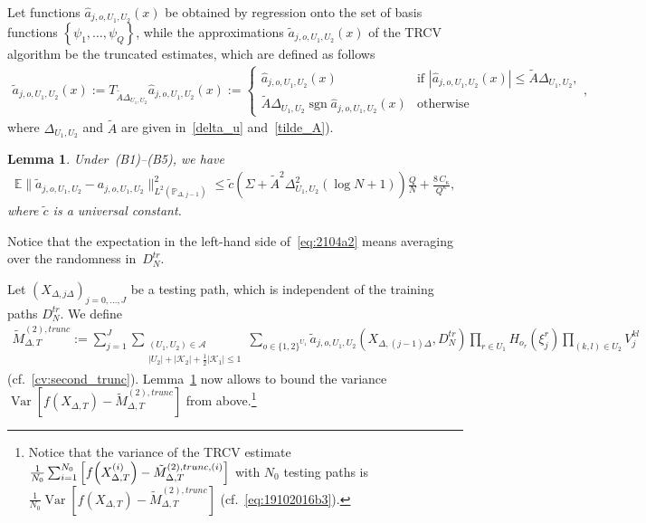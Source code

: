 \documentclass[11pt,a4paper]{amsart}
\theoremstyle{plain}
\newtheorem{lemma}[theorem]{Lemma}
\theoremstyle{definition}
\theoremstyle{remark}
\numberwithin{equation}{section}
\newcommand*{\E}{\mathbb{E}}
\newcommand*{\Var}{\operatorname{Var}}
\newcommand*{\PP}{\mathbb P}
\newcommand*{\cA}{\mathcal A}
\DeclareMathOperator{\sgn}{sgn}
\renewcommand*{\doteq}{:=}
\begin{document}
Let functions $\hat a_{j,o,U_1,U_2}(x)$
be obtained by regression onto the set of basis functions
$\left\{\psi_{1},\ldots,\psi_{Q}\right\}$,
while the approximations
$\tilde a_{j,o,U_1,U_2}(x)$ of the TRCV algorithm
be the truncated estimates, which are defined as follows
\begin{align}
\label{trunc_A}
\tilde a_{j,o,U_1,U_2}(x)\doteq
T_{\tilde A\Delta_{U_1,U_2}}\hat a_{j,o,U_1,U_2}(x)\doteq
\begin{cases}
\hat a_{j,o,U_1,U_2}(x)&\text{if }|\hat a_{j,o,U_1,U_2}(x)|\le\tilde A\Delta_{U_1,U_2},\\
\tilde A\Delta_{U_1,U_2}\sgn\hat a_{j,o,U_1,U_2}(x)&\text{otherwise}
\end{cases},
\end{align}
where $\Delta_{U_1,U_2}$ and $\tilde A$ are given in~\eqref{delta_u} and~\eqref{tilde_A}).

\begin{lemma}\label{th:2104a1}
Under~(B1)--(B5), we have
\begin{align}\label{eq:2104a2}
\E\|\tilde a_{j,o,U_1,U_2}-a_{j,o,U_1,U_2}\|^2_{L^2(\PP_{\Delta,j-1})}
\le\tilde{c}(\Sigma+\tilde A^2\Delta_{U_1,U_2}^2(\log N+1))\frac{Q}{N}
+\frac{8\,C_\kappa}{Q^\kappa},
\end{align}
where $\tilde{c}$ is a universal constant.
\end{lemma}
Notice that the expectation in the left-hand side of~\eqref{eq:2104a2}
means averaging over the randomness in~$D_N^{tr}$.

Let $(X_{\Delta,j\Delta})_{j=0,\ldots,J}$
be a testing path, which is independent of the
training paths $D_N^{tr}$.
We define
\begin{align}\label{eq:0101a1}
\widetilde{M}^{(2),trunc}_{\Delta,T}\doteq\sum_{j=1}^J
\sum_{\substack{(U_1,U_2)\in\cA\\ \left|U_2\right|+\left|\mathcal{K}_2\right|+\frac{1}{2}\left|\mathcal{K}_1\right|\le 1}}
\sum_{o\in\{1,2\}^{U_1}}
\tilde{a}_{j,o,U_1,U_2}(X_{\Delta,(j-1)\Delta},D_N^{tr})
\prod_{r\in U_1} H_{o_r}(\xi_j^{r})
\prod_{(k,l)\in U_2} V_j^{kl}
\end{align}
(cf.~\eqref{cv:second_trunc}).
Lemma~\ref{th:2104a1} now allows to bound the variance
$\Var[f(X_{\Delta,T})-\widetilde M_{\Delta,T}^{(2),trunc}]$
from above.\footnote{\label{ft:1301a1}Notice that the variance
of the TRCV estimate
$\frac{1}{N_0}\sum_{i=1}^{N_0}
\left[f\Bigl(X_{\Delta,T}^{(i)}\Bigr)-\tilde M_{\Delta,T}^{(2),trunc,(i)}\right]$
with $N_0$ testing paths
is $\frac1{N_0}\Var[f(X_{\Delta,T})-\tilde M_{\Delta,T}^{(2),trunc}]$ (cf.~\eqref{eq:19102016b3}).}
\end{document}

